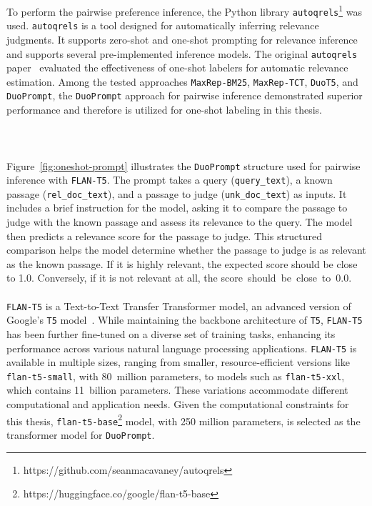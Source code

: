 \noindent To perform the pairwise preference inference, the Python library \texttt{autoqrels}\footnote{\scriptsize https://github.com/seanmacavaney/autoqrels} was used. \texttt{autoqrels} is a tool designed for automatically inferring relevance judgments. It supports zero-shot and one-shot prompting for relevance inference and supports several pre-implemented inference models. The original \texttt{autoqrels} paper~\cite{macavaney:2023} evaluated the effectiveness of one-shot labelers for automatic relevance estimation. Among the tested approaches \texttt{MaxRep-BM25}, \texttt{MaxRep-TCT}, \texttt{DuoT5}, and \texttt{DuoPrompt}, the \texttt{DuoPrompt} approach for pairwise \mbox{inference} demonstrated superior performance and therefore is utilized for \linebreak one-shot labeling in this thesis.
\\\\\\\\
Figure~\ref{fig:oneshot-prompt} illustrates the \texttt{DuoPrompt} structure used for pairwise inference with \texttt{FLAN-T5}. The prompt takes a query (\texttt{query\_text}), a known passage (\texttt{rel\_doc\_text}), and a passage to judge (\texttt{unk\_doc\_text}) as inputs. It includes a brief instruction for the model, asking it to compare the passage to judge with the known passage and assess its relevance to the query. The model then predicts a relevance score for the passage to judge. This structured comparison helps the model determine whether the passage to judge is as relevant as the known passage. If it is highly relevant, the expected score should be close to 1.0. Conversely, if it is not relevant at all, the \mbox{score should be close to 0.0}.
\\\\
\texttt{FLAN-T5} is a Text-to-Text Transfer Transformer model, an advanced version of Google's \texttt{T5} model~\cite{raffel:2020}. While maintaining the backbone architecture of \texttt{T5}, \texttt{FLAN-T5} has been further fine-tuned on a diverse set of training tasks, enhancing its performance across various natural language processing applications. \texttt{FLAN-T5} is available in multiple sizes, ranging from smaller, resource-efficient versions like \texttt{flan-t5-small}, with 80~million parameters, to models such as \texttt{flan-t5-xxl}, which contains 11~billion parameters. These variations accommodate different computational and application needs. Given the computational constraints for this thesis, \texttt{flan-t5-base}\footnote{\scriptsize https://huggingface.co/google/flan-t5-base} model, with 250 \mbox{million} parameters, is selected as the transformer model for \texttt{DuoPrompt}.
